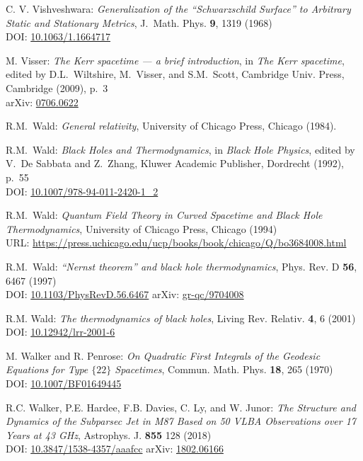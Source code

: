 \begin{thebibliography}{123}
C. V. Vishveshwara:
{\em Generalization of the ``Schwarzschild Surface'' to Arbitrary Static and Stationary Metrics},
J.~Math. Phys. {\bf 9}, 1319 (1968)\\
DOI: \href{https://doi.org/10.1063/1.1664717}{10.1063/1.1664717}

M. Visser: {\em The Kerr spacetime --- a brief introduction},
in {\em The Kerr spacetime}, edited by D.L.~Wiltshire, M.~Visser, and S.M.~Scott,
Cambridge Univ. Press, Cambridge (2009), p.~3\\
arXiv: \href{https://arxiv.org/abs/0706.0622}{0706.0622}

R.M.~Wald:
{\em General relativity},
University of Chicago Press, Chicago (1984).

R.M.~Wald:
{\em Black Holes and Thermodynamics},
in {\em Black Hole Physics}, edited by V.~De Sabbata and Z.~Zhang,
Kluwer Academic Publisher, Dordrecht (1992), p.~55\\
DOI: \href{https://doi.org/10.1007/978-94-011-2420-1_2}{10.1007/978-94-011-2420-1\_2}

R.M.~Wald:
{\em Quantum Field Theory in Curved Spacetime and Black Hole Thermodynamics},
University of Chicago Press, Chicago (1994)\\
URL: \url{https://press.uchicago.edu/ucp/books/book/chicago/Q/bo3684008.html}

R.M.~Wald:
{\em ``Nernst theorem'' and black hole thermodynamics},
Phys. Rev. D {\bf 56}, 6467 (1997)\\
DOI: \href{https://doi.org/10.1103/PhysRevD.56.6467}{10.1103/PhysRevD.56.6467}\hfill
arXiv: \href{https://arxiv.org/abs/gr-qc/9704008}{gr-qc/9704008}

R.M. Wald: {\em The thermodynamics of black holes},
Living Rev. Relativ. {\bf 4}, 6 (2001) \\
DOI: \href{https://doi.org/10.12942/lrr-2001-6}{10.12942/lrr-2001-6}

M. Walker and R. Penrose: {\em On Quadratic First Integrals of the Geodesic Equations
for Type $\{22\}$ Spacetimes},
Commun. Math. Phys. {\bf 18}, 265 (1970)\\
DOI: \href{https://doi.org/10.1007/BF01649445}{10.1007/BF01649445}

R.C. Walker, P.E. Hardee, F.B. Davies, C. Ly, and W. Junor:
{\em The Structure and Dynamics of the Subparsec Jet in M87 Based on 50 VLBA Observations over 17 Years at 43 GHz},
Astrophys. J. {\bf 855} 128 (2018)\\
DOI: \href{https://doi.org/10.3847/1538-4357/aaafcc}{10.3847/1538-4357/aaafcc}\hfill
arXiv: \href{https://arxiv.org/abs/1802.06166}{1802.06166}


\end{thebibliography}
